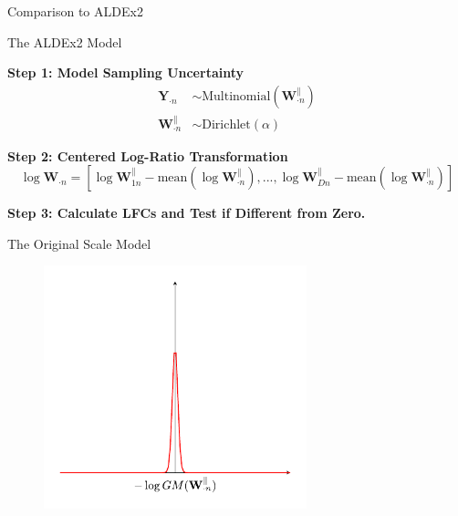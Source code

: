 \documentclass[
  ignorenonframetext,
]{beamer}
\begin{document}
\begin{frame}{Comparison to ALDEx2}
\protect\hypertarget{comparison-to-aldex2}{}
\begin{block}{The ALDEx2 Model}

\textbf{Step 1: Model Sampling Uncertainty}
\begin{align*}
\mathbf{Y}_{\cdot n} &\sim \text{Multinomial}(\mathbf{W}_{\cdot n}^\parallel)\\
\mathbf{W}_{\cdot n}^\parallel &\sim \text{Dirichlet}(\alpha)
\end{align*}

\textbf{Step 2: Centered Log-Ratio Transformation}
\begin{equation*}
\log \mathbf{W}_{\cdot n} = \left[\log \mathbf{W}_{1n}^\parallel - \text{mean}(\log \mathbf{W}_{\cdot n}^\parallel), ..., \log \mathbf{W}_{Dn}^\parallel - \text{mean}(\log \mathbf{W}_{\cdot n}^\parallel) \right]
\end{equation*}

\textbf{Step 3: Calculate LFCs and Test if Different from Zero.}

\end{block}
\end{frame}

\begin{frame}{The Original Scale Model}
\protect\hypertarget{the-original-scale-model}{}
\begin{figure}
  \centering
  \includegraphics[width=3in]{figures/scale-model-figure-1.pdf}
\end{figure}
\end{frame}
\end{document}
